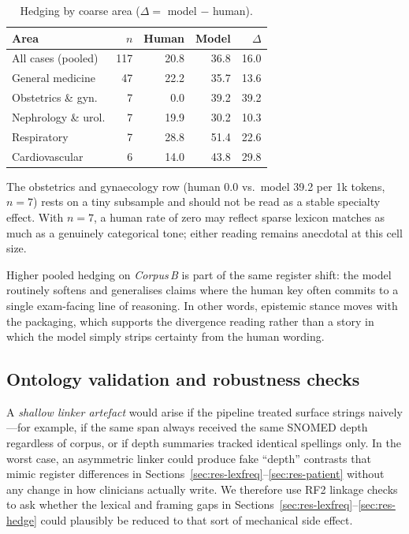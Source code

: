 \documentclass[11pt,a4paper]{article}
\newcommand{\CB}{\emph{Corpus\,B}}
\begin{document}
\begin{table}[htbp]
\centering
\small
\caption{Hedging by coarse area ($\Delta =$ model $-$ human).}
\label{tab:hedging}
\begin{tabular}{@{}lrrrr@{}}
\toprule
Area & $n$ & Human & Model & $\Delta$ \\
\midrule
All cases (pooled) & 117 & 20.8 & 36.8 & 16.0 \\
General medicine & 47 & 22.2 & 35.7 & 13.6 \\
Obstetrics \& gyn. & 7 & 0.0 & 39.2 & 39.2 \\
Nephrology \& urol. & 7 & 19.9 & 30.2 & 10.3 \\
Respiratory & 7 & 28.8 & 51.4 & 22.6 \\
Cardiovascular & 6 & 14.0 & 43.8 & 29.8 \\
\bottomrule
\end{tabular}
\end{table}

\noindent The obstetrics and gynaecology row (human 0.0 vs.\ model 39.2 per 1k tokens, $n=7$) rests on a tiny subsample and should not be read as a stable specialty effect. With $n=7$, a human rate of zero may reflect sparse lexicon matches as much as a genuinely categorical tone; either reading remains anecdotal at this cell size.

Higher pooled hedging on \CB{} is part of the same register shift: the model routinely softens and generalises claims where the human key often commits to a single exam-facing line of reasoning. In other words, epistemic stance moves with the packaging, which supports the divergence reading rather than a story in which the model simply strips certainty from the human wording.

\FloatBarrier

\subsection{Ontology validation and robustness checks}\label{sec:snomed}
A \emph{shallow linker artefact} would arise if the pipeline treated surface strings naively---for example, if the same span always received the same SNOMED depth regardless of corpus, or if depth summaries tracked identical spellings only. In the worst case, an asymmetric linker could produce fake ``depth'' contrasts that mimic register differences in Sections~\ref{sec:res-lexfreq}--\ref{sec:res-patient} without any change in how clinicians actually write. We therefore use RF2 linkage checks \cite{snomed2026,neumann2019} to ask whether the lexical and framing gaps in Sections~\ref{sec:res-lexfreq}--\ref{sec:res-hedge} could plausibly be reduced to that sort of mechanical side effect.
\end{document}
